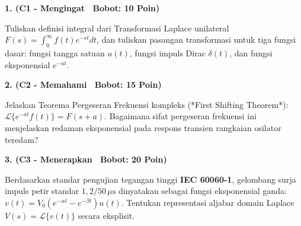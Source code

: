 \documentclass[10pt,a4paper]{article}
\begin{document}
\par
\vspace{1mm}

\noindent\textbf{1. (C1 - Mengingat \textbar\ Bobot: 10 Poin)}\par\vspace{0.8mm}
{\footnotesize Tuliskan definisi integral dari Transformasi Laplace unilateral $F(s) = \int_0^\infty f(t) e^{-st} dt$, dan tuliskan pasangan transformasi untuk tiga fungsi dasar: fungsi tangga satuan $u(t)$, fungsi impuls Dirac $\delta(t)$, dan fungsi eksponensial $e^{-at}$.}\par

\vspace{2.5mm}

\noindent\textbf{2. (C2 - Memahami \textbar\ Bobot: 15 Poin)}\par\vspace{0.8mm}
{\footnotesize Jelaskan Teorema Pergeseran Frekuensi kompleks (*First Shifting Theorem*): $\mathcal{L}\{e^{-at} f(t)\} = F(s+a)$. Bagaimana sifat pergeseran frekuensi ini menjelaskan redaman eksponensial pada respons transien rangkaian osilator teredam?}\par

\vspace{2.5mm}

\noindent\textbf{3. (C3 - Menerapkan \textbar\ Bobot: 20 Poin)}\par\vspace{0.8mm}
\noindent\begin{minipage}[t]{0.60\textwidth}%
  {\footnotesize Berdasarkan standar pengujian tegangan tinggi \textbf{IEC 60060-1}, gelombang surja impuls petir standar $1{,}2/50\,\mu\text{s}$ dinyatakan sebagai fungsi eksponensial ganda: $v(t) = V_0 (e^{-\alpha t} - e^{-\beta t}) u(t)$. Tentukan representasi aljabar domain Laplace $V(s) = \mathcal{L}\{v(t)\}$ secara eksplisit.}%
\end{minipage}%
\hfill%
\begin{minipage}[t]{0.37\textwidth}%
  \centering
\end{minipage}\par
\end{document}
